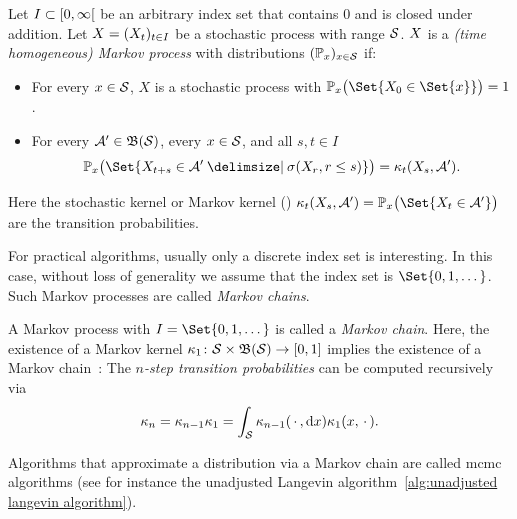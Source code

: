 \begin{definition}%
	\label{def:markov process}
	Let \( I \subset \rinterval{\num{0}}{\infty} \) be an arbitrary index set that contains \( \num{0} \) and is closed under addition.
	Let \( X = (X_t)_{t \in I} \) be a stochastic process with range \( \mathcal{S} \).
	\( X \) is a \emph{(time homogeneous) Markov process} with distributions \( (\mathbb{P}_x)_{x \in \mathcal{S}} \) if:
	\begin{itemize}
		\item For every \( x \in \mathcal{S} \), \( X \) is a stochastic process with \( \ProbabilityMeasure_x\bigl(\Set{\RandomVariable_{\num{0}} \in  \Set{x}} \bigr) = \num{1} \).
		\item For every \( \mathcal{A}^\prime \in \mathfrak{B}(\mathcal{S}) \), every \( x \in \mathcal{S} \), and all \( s,t \in I \)
			\begin{equation}
					\ProbabilityMeasure_x \bigl( \Set{X_{t+s}\in\Event \given \sigma(X_r, r\leq s)} \bigr) = \kappa_t(\RandomVariable_s, \Event).
			\end{equation}
	\end{itemize}
	Here the stochastic kernel or Markov kernel (\cite[Definition 8.25]{Klenke2014}) \( \kappa_t(\RandomVariable_s, \Event) = \ProbabilityMeasure_x\bigl(\Set{X_t \in \Event}\bigr) \) are the transition probabilities.
\end{definition}
For practical algorithms, usually only a discrete index set is interesting.
In this case, without loss of generality we assume that the index set is \( \Set{\num{0}, \num{1}, \dotsc} \).
Such Markov processes are called \emph{Markov chains}.
\begin{definition}%
	\label{def:markov chain}
	A Markov process with \( I = \Set{\num{0},\num{1},\dotsc} \) is called a \emph{Markov chain}.
	Here, the existence of a Markov kernel \( \kappa_{\num{1}} \colon \mathcal{S} \times \mathfrak{B}(\mathcal{S}) \to [\num{0}, \num{1}] \) implies the existence of a Markov chain~\cite[Theorem 17.11]{Klenke2014}:
	The \emph{\( n \)-step transition probabilities} can be computed recursively via
	\begin{equation}
		\kappa_n = \kappa_{n-{\num{1}}} \kappa_{\num{1}} = \int_{\mathcal{S}} \kappa_{n-{\num{1}}}(\,\cdot\,,\mathrm{d}x)\kappa_{\num{1}}(x, \,\cdot\,).
	\end{equation}
\end{definition}
Algorithms that approximate a distribution via a Markov chain are called \gls{mcmc} algorithms (see for instance the unadjusted Langevin algorithm~\cref{alg:unadjusted langevin algorithm}).
